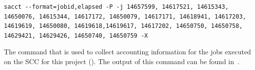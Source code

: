 \documentclass[12pt, a4paper, hidelinks]{article}
\begin{document}
\begin{listing}[H]
\begin{verbatim}
sacct --format=jobid,elapsed -P -j 14657599, 14617521, 14615343, 14650076, 14615344, 14617172, 14650079, 14617171, 14618941, 14617203, 14619619, 14650080, 14619618,14619617, 14617202, 14650750, 14650758, 14629421, 14629426, 14650740, 14650759 -X
        \end{verbatim}
\caption[Sacct command]{The command that is used to collect accounting information for the jobs executed on the \ac{SCC} for this project (). The output of this command can be found in~.}
\label{lst:sacct_command}
\end{listing}
\end{document}
